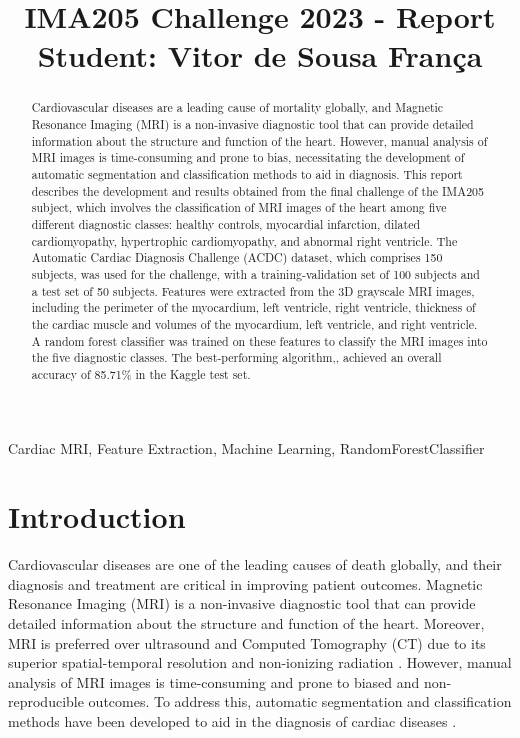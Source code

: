\documentclass[conference]{IEEEtran}
\begin{document}
\title{IMA205 Challenge 2023 - Report\\
{\footnotesize Student: Vitor de Sousa França}}

\maketitle

\begin{abstract}
    Cardiovascular diseases are a leading cause of mortality globally, and Magnetic Resonance Imaging (MRI) is a 
    non-invasive diagnostic tool that can provide detailed information about the structure and function of the heart.
    However, manual analysis of MRI images is time-consuming and prone to bias, necessitating the development of automatic
    segmentation and classification methods to aid in diagnosis. This report describes the development and results obtained
    from the final challenge of the IMA205 subject, which involves the classification of MRI images of the heart among five
    different diagnostic classes: healthy controls, myocardial infarction, dilated cardiomyopathy, hypertrophic 
    cardiomyopathy, and abnormal right ventricle. The Automatic Cardiac Diagnosis Challenge (ACDC) dataset, which 
    comprises 150 subjects, was used for the challenge, with a training-validation set of 100 subjects and a test set of 
    50 subjects. Features were extracted from the 3D grayscale MRI images, including the perimeter of the myocardium, 
    left ventricle, right ventricle, thickness of the cardiac muscle and volumes of the myocardium, left ventricle, 
    and right ventricle. A random forest classifier was trained on these features to classify the MRI images into 
    the five diagnostic classes. The best-performing algorithm,, achieved an overall accuracy of 85.71\% in the Kaggle 
    test set. 
\end{abstract}

\begin{IEEEkeywords}
    Cardiac MRI, Feature Extraction, Machine Learning, RandomForestClassifier 
\end{IEEEkeywords}

\section{Introduction}
    Cardiovascular diseases are one of the leading causes of death globally, and their diagnosis
    and treatment are critical in improving patient outcomes. Magnetic Resonance Imaging (MRI)
    is a non-invasive diagnostic tool that can provide detailed information about the structure
    and function of the heart. Moreover, MRI is preferred over ultrasound and Computed Tomography (CT) due
    to its superior spatial-temporal resolution and non-ionizing radiation \cite{Fabian2018}.
    However, manual analysis of MRI images is time-consuming and prone to biased and non-reproducible
    outcomes. To address this, automatic segmentation and classification methods have been developed
    to aid in the diagnosis of cardiac diseases \cite{Khened2018}.
\end{document}
